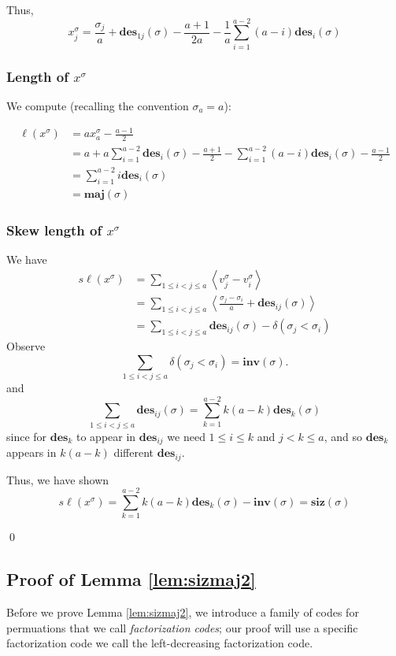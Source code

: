 \documentclass{amsart}[12pt]
\theoremstyle{definition}
\newcommand{\sk}{s\ell}
\newcommand{\inv}{\mathbf{inv}}
\newcommand{\des}{\mathbf{des}}
\newcommand{\maj}{\mathbf{maj}}
\newcommand{\siz}{\mathbf{siz}}
\begin{document}
Thus,
$$x^\sigma_j=\frac{\sigma_j}{a}+\des_{1j}(\sigma)-\frac{a+1}{2a}-\frac{1}{a}\sum_{i=1}^{a-2} (a-i)\des_i(\sigma)$$

\subsubsection{Length of $x^\sigma$}
We compute (recalling the convention $\sigma_a=a$):

\begin{align*}
\ell(x^\sigma) &= a x^\sigma_a-\frac{a-1}{2} \\
&=a+a\sum_{i=1}^{a-2} \des_i(\sigma)-\frac{a+1}{2}-\sum_{i=1}^{a-2} (a-i)\des_i(\sigma)-\frac{a-1}{2} \\
&=\sum_{i=1}^{a-2} i\des_i(\sigma) \\
&=\maj(\sigma)
\end{align*}


\subsubsection{Skew length of $x^\sigma$}
We have
\begin{align*}
\sk (x^\sigma) &=\sum_{1\leq i <j \leq a} \left\langle v^\sigma_j-v^\sigma_i\right\rangle \\
&=\sum_{1\leq i <j \leq a} \left\langle\frac{\sigma_j-\sigma_i}{a}+\des_{ij}(\sigma)\right\rangle \\
&=\sum_{1\leq i<j\leq a} \des_{ij}(\sigma)-\delta(\sigma_j<\sigma_i)
\end{align*}
Observe
$$\sum_{1\leq i<j\leq a} \delta(\sigma_j<\sigma_i)=\inv(\sigma).$$  
and
$$\sum_{1\leq i<j\leq a} \des_{ij}(\sigma)=\sum_{k=1}^{a-2} k(a-k)\des_k(\sigma)$$
since for $\des_k$ to appear in $\des_{ij}$ we need $1\leq i\leq k$ and $j<k\leq a$, and so $\des_k$ appears in $k(a-k)$ different $\des_{ij}$.

Thus, we have shown
$$\sk(x^\sigma)=\sum_{k=1}^{a-2} k(a-k)\des_k(\sigma)-\inv(\sigma)=\siz(\sigma)$$

\qed

\subsection{Proof of Lemma \ref{lem:sizmaj2}}




Before we prove Lemma \ref{lem:sizmaj2}, we introduce a family of codes for permuations that we call \emph{factorization codes}; our proof will use a specific factorization code we call the left-decreasing factorization code.
\end{document}
